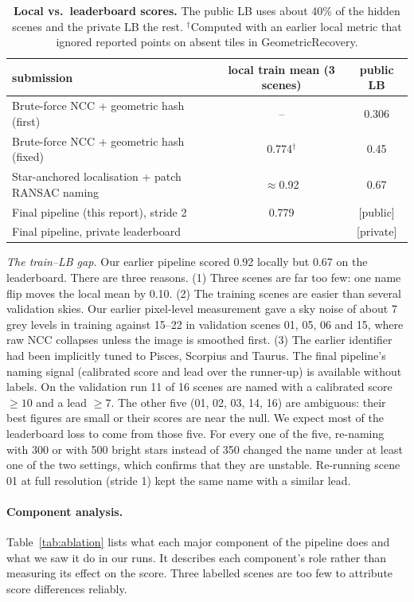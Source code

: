 \documentclass[a4paper,11pt]{article}
\newcommand{\fillin}[1]{{\color{red}[#1]}}
\begin{document}
\begin{table}[h]
\centering\small
\begin{tabular}{lcc}
\toprule
submission & local train mean (3 scenes) & public LB \\
\midrule
Brute-force NCC + geometric hash (first) & -- & 0.306 \\
Brute-force NCC + geometric hash (fixed) & 0.774$^\dagger$ & 0.45 \\
Star-anchored localisation + patch RANSAC naming & $\approx$0.92 & 0.67 \\
Final pipeline (this report), stride 2 & 0.779 & \fillin{public} \\
\midrule
Final pipeline, private leaderboard & & \fillin{private} \\
\bottomrule
\end{tabular}
\caption{\textbf{Local vs.\ leaderboard scores.} The public LB uses about 40\% of the hidden scenes and the private LB the
rest. $^\dagger$Computed with an earlier local metric that ignored reported points on absent tiles in GeometricRecovery.}
\label{tab:lb}
\end{table}

\emph{The train--LB gap.} Our earlier pipeline scored 0.92 locally but 0.67 on the leaderboard. There are three
reasons. (1) Three scenes are far too few: one name flip moves the local mean by 0.10. (2) The training scenes are
easier than several validation skies. Our earlier pixel-level measurement gave a sky noise of about 7 grey levels in
training against 15--22 in validation scenes 01, 05, 06 and 15, where raw NCC collapses unless the image is smoothed
first. (3) The earlier identifier had been implicitly tuned to Pisces, Scorpius and Taurus. The final
pipeline's naming signal (calibrated score and lead over the runner-up) is available without labels. On the validation
run 11 of 16 scenes are named with a calibrated score $\ge10$ and a lead $\ge7$. The other five (01, 02, 03, 14, 16) are
ambiguous: their best figures are small or their scores are near the null. We expect most of the leaderboard loss to come
from those five. For every one of the five, re-naming with 300 or with 500 bright stars instead of 350 changed the name under at
least one of the two settings, which confirms that they are unstable. Re-running scene 01 at full resolution (stride 1)
kept the same name with a similar lead.

\paragraph{Component analysis.} Table~\ref{tab:ablation} lists what each major component of the pipeline does
and what we saw it do in our runs. It describes each component's role rather than measuring its effect on the score.
Three labelled scenes are too few to attribute score differences reliably.
\end{document}
